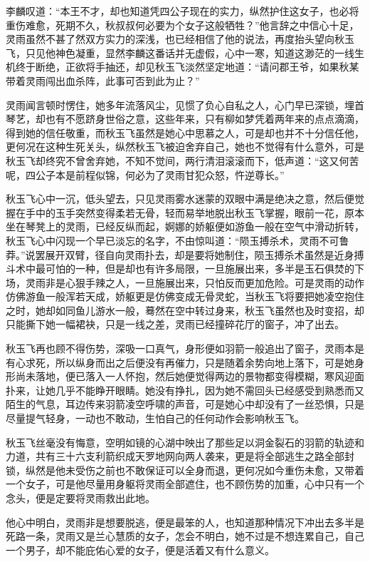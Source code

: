 李麟叹道：“本王不才，却也知道凭四公子现在的实力，纵然护住这女子，也必将重伤难愈，死期不久，秋叔叔何必要为个女子这般牺牲？”他言辞之中信心十足，灵雨虽然不甚了然双方实力的深浅，也已经相信了他的说法，再度抬头望向秋玉飞，只见他神色凝重，显然李麟这番话并无虚假，心中一寒，知道这渺茫的一线生机终于断绝，正欲将手抽还，却见秋玉飞淡然坚定地道：“请问郡王爷，如果秋某带着灵雨闯出血杀阵，此事可否到此为止？”

灵雨闻言顿时愣住，她多年流落风尘，见惯了负心自私之人，心门早已深锁，埋首琴艺，却也有不愿跻身世俗之意，这些年来，只有柳如梦凭着两年来的点点滴滴，得到她的信任敬重，而秋玉飞虽然是她心中思慕之人，可是却也并不十分信任他，更何况在这种生死关头，纵然秋玉飞被迫舍弃自己，她也不觉得有什么意外，可是秋玉飞却终究不曾舍弃她，不知不觉间，两行清泪滚滚而下，低声道：“这又何苦呢，四公子本是前程似锦，何必为了灵雨甘犯众怒，忤逆尊长。”

秋玉飞心中一沉，低头望去，只见灵雨雾水迷蒙的双眼中满是绝决之意，然后便觉握在手中的玉手突然变得柔若无骨，轻而易举地脱出秋玉飞掌握，眼前一花，原本坐在琴凳上的灵雨，已经反纵而起，婀娜的娇躯便如游鱼一般在空气中滑动折转，秋玉飞心中闪现一个早已淡忘的名字，不由惊叫道：“陨玉搏杀术，灵雨不可鲁莽。”说罢展开双臂，径自向灵雨扑去，却是要将她制住，陨玉搏杀术虽然是近身搏斗术中最可怕的一种，但是却也有许多局限，一旦施展出来，多半是玉石俱焚的下场，灵雨非是心狠手辣之人，一旦施展出来，只怕反而更加危险。可是灵雨的动作仿佛游鱼一般浑若天成，娇躯更是仿佛变成无骨灵蛇，当秋玉飞将要把她凌空抱住之时，她却如同鱼儿游水一般，蓦然在空中转过身来，秋玉飞虽然也及时变招，却只能撕下她一幅裙袂，只是一线之差，灵雨已经撞碎花厅的窗子，冲了出去。

秋玉飞再也顾不得伤势，深吸一口真气，身形便如羽箭一般追出了窗子，灵雨本是有心求死，所以纵身而出之后便没有再催力，只是随着余势向地上落下，可是她身形尚未落地，便已落入一人怀抱，然后她便觉得两边的景物都变得模糊，寒风迎面扑来，让她几乎不能睁开眼睛。她没有挣扎，因为她不需回头已经感受到熟悉而又陌生的气息，耳边传来羽箭凌空呼啸的声音，可是她心中却没有了一丝恐惧，只是尽量提气轻身，一动也不敢动，生怕自己的任何动作会影响秋玉飞。

秋玉飞丝毫没有悔意，空明如镜的心湖中映出了那些足以洞金裂石的羽箭的轨迹和力道，共有三十六支利箭织成天罗地网向两人袭来，更是将全部逃生之路全部封锁，纵然是他未受伤之前也不敢保证可以全身而退，更何况如今重伤未愈，又带着一个女子，可是他尽量用身躯将灵雨全部遮住，也不顾伤势的加重，心中只有一个念头，便是定要将灵雨救出此地。

他心中明白，灵雨非是想要脱逃，便是最笨的人，也知道那种情况下冲出去多半是死路一条，灵雨又是兰心慧质的女子，怎会不明白，她不过是不想连累自己，自己一个男子，却不能庇佑心爱的女子，便是活着又有什么意义。

